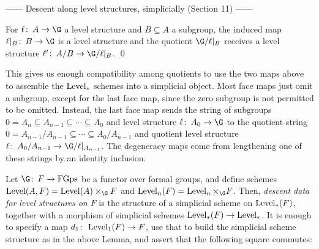 ------ Descent along level structures, simplicially (Section 11) ------


\begin{lemma}
For $\ell\co A \to \G$ a level structure and $B \subseteq A$ a subgroup, the induced map $\ell|_B\co B \to \G$ is a level structure and the quotient $\G / \ell|_B$ receives a level structure $\ell'\co A/B \to \G/\ell|_B$. \qed
\end{lemma}

This gives us enough compatibility among quotients to use the two maps above to assemble the $\operatorname{Level}_*$ schemes into a simplicial object.  Most face maps just omit a subgroup, except for the last face map, since the zero subgroup is not permitted to be omitted.  Instead, the last face map sends the string of subgroups $0 = A_n \subseteq A_{n-1} \subseteq \cdots \subseteq A_0$ and level structure $\ell\co A_0 \to \G$ to the quotient string $0 = A_{n-1} / A_{n-1} \subseteq \cdots \subseteq A_0 / A_{n-1}$ and quotient level structure $\ell\co A_0 / A_{n-1} \to \G/\ell|_{A_{n-1}}$.  The degeneracy maps come from lengthening one of these strings by an identity inclusion.

\begin{definition}
Let $\G\co F \to \FGps$ be a functor over formal groups, and define schemes $\Level(A, F) = \Level(A) \times_{\G} F$ and $\Level_n(F) = \Level_n \times_{\G} F$.  Then, \textit{descent data for level structures on $F$} is the structure of a simplicial scheme on $\operatorname{Level}_*(F)$, together with a morphism of simplicial schemes $\operatorname{Level}_*(F) \to \operatorname{Level}_*$.  It is enough to specify a map $d_1\colon\thinspace \operatorname{Level}_1(F) \to F$, use that to build the simplicial scheme structure as in the above Lemma, and assert that the following square commutes:
\begin{center}
\end{center}
\end{definition}


